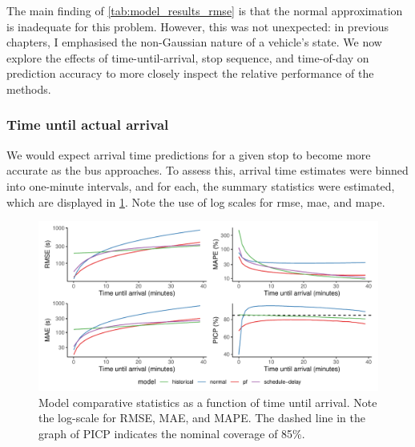 The main finding of \cref{tab:model_results_rmse} is that the normal approximation is inadequate for this problem. However, this was not unexpected: in previous chapters, I emphasised the non-Gaussian nature of a vehicle's state. We now explore the effects of time-until-arrival, stop sequence, and time-of-day on prediction accuracy to more closely inspect the relative performance of the methods.


\subsubsection{Time until actual arrival}

We would expect arrival time predictions for a given stop to become more accurate as the bus approaches. To assess this, arrival time estimates were binned into one-minute intervals, and for each, the summary statistics were estimated, which are displayed in \cref{fig:model_results_rmse_time}. Note the use of log scales for \gls{rmse}, \gls{mae}, and \gls{mape}.


\begin{knitrout}\small
{}\color{fgcolor}\begin{figure}
\includegraphics[width=\textwidth]{figure/model_results_rmse_time-1} \caption[Model comparative statistics as a function of time until arrival]{Model comparative statistics as a function of time until arrival. Note the log-scale for RMSE, MAE, and MAPE. The dashed line in the graph of PICP indicates the nominal coverage of 85\%.}\label{fig:model_results_rmse_time}
\end{figure}


\end{knitrout}

